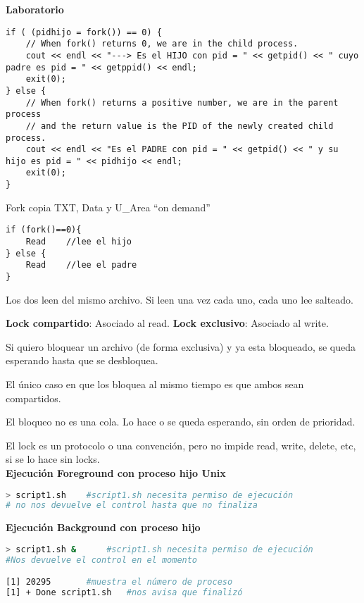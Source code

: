 \documentclass[a4paper, twoside]{article}
\begin{document}
\textbf{Laboratorio}

\begin{lstlisting}
if ( (pidhijo = fork()) == 0) {
	// When fork() returns 0, we are in the child process.
	cout << endl << "---> Es el HIJO con pid = " << getpid() << " cuyo padre es pid = " << getppid() << endl;
	exit(0);
} else {
	// When fork() returns a positive number, we are in the parent process
	// and the return value is the PID of the newly created child process.
	cout << endl << "Es el PADRE con pid = " << getpid() << " y su hijo es pid = " << pidhijo << endl;
	exit(0);
}
\end{lstlisting}

Fork copia TXT, Data y U\_Area “on demand”

\begin{lstlisting}
if (fork()==0){
	Read	//lee el hijo
} else {
	Read	//lee el padre
}
\end{lstlisting}

Los dos leen del mismo archivo. Si leen una vez cada uno, cada uno lee salteado.

\textbf{Lock compartido}: Asociado al read.
\textbf{Lock exclusivo}: Asociado al write.

Si quiero bloquear un archivo (de forma exclusiva) y ya esta bloqueado, se queda esperando hasta que se desbloquea.

El único caso en que los bloquea al mismo tiempo es que ambos sean compartidos.

El bloqueo no es una cola. Lo hace o se queda esperando, sin orden de prioridad.

El lock es un protocolo o una convención, pero no impide read, write, delete, etc, si se lo hace sin locks.\\

\textbf{Ejecución Foreground con proceso hijo Unix}
\begin{lstlisting}[language=sh]
> script1.sh 	#script1.sh necesita permiso de ejecución
# no nos devuelve el control hasta que no finaliza
\end{lstlisting}

\textbf{Ejecución Background con proceso hijo}
\begin{lstlisting}[language=sh]
> script1.sh & 		#script1.sh necesita permiso de ejecución
#Nos devuelve el control en el momento

[1] 20295 		#muestra el número de proceso
[1] + Done script1.sh 	#nos avisa que finalizó
\end{lstlisting}
\end{document}
